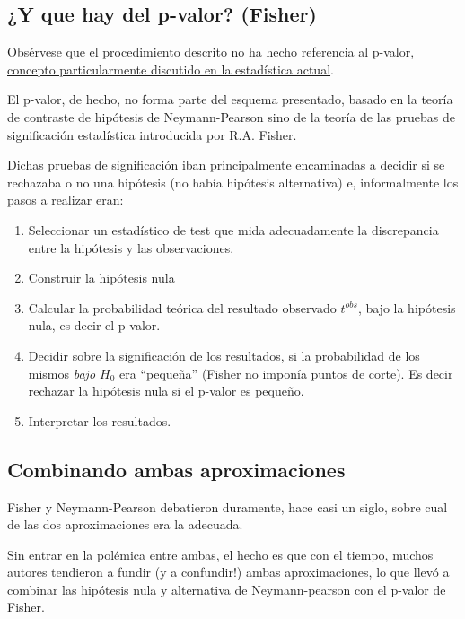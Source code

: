 \documentclass[
]{article}
\begin{document}
\subsection{¿Y que hay del p-valor? (Fisher)}\label{y-que-hay-del-p-valor-fisher}

Obsérvese que el procedimiento descrito no ha hecho referencia al p-valor, \href{https://www.amstat.org/asa/files/pdfs/p-valuestatement.pdf}{concepto particularmente discutido en la estadística actual}.

El p-valor, de hecho, no forma parte del esquema presentado, basado en la teoría de contraste de hipótesis de Neymann-Pearson sino de la teoría de las pruebas de significación estadística introducida por R.A. Fisher.

Dichas pruebas de significación iban principalmente encaminadas a decidir si se rechazaba o no una hipótesis (no había hipótesis alternativa) e, informalmente los pasos a realizar eran:

\begin{enumerate}
\def\labelenumi{\arabic{enumi}.}
\item
  Seleccionar un estadístico de test que mida adecuadamente la discrepancia entre la hipótesis y las observaciones.
\item
  Construir la hipótesis nula
\item
  Calcular la probabilidad teórica del resultado observado \(t^{obs}\), bajo la hipótesis nula, es decir el p-valor.
\item
  Decidir sobre la significación de los resultados, si la probabilidad de los mismos \emph{bajo \(H_0\)} era ``pequeña'' (Fisher no imponía puntos de corte). Es decir rechazar la hipótesis nula si el p-valor es pequeño.
\item
  Interpretar los resultados.
\end{enumerate}

\subsection{Combinando ambas aproximaciones}\label{combinando-ambas-aproximaciones}

Fisher y Neymann-Pearson debatieron duramente, hace casi un siglo, sobre cual de las dos aproximaciones era la adecuada.

Sin entrar en la polémica entre ambas, el hecho es que con el tiempo, muchos autores tendieron a fundir (y a confundir!) ambas aproximaciones, lo que llevó a combinar las hipótesis nula y alternativa de Neymann-pearson con el p-valor de Fisher.
\end{document}
